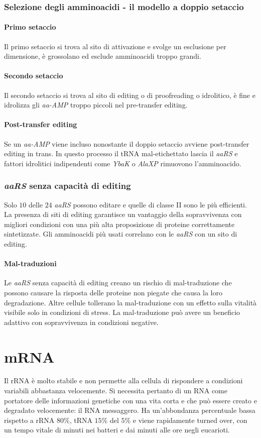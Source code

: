\subsubsection{Selezione degli amminoacidi - il modello a doppio setaccio}
\paragraph{Primo setaccio}
Il primo setaccio si trova al sito di attivazione e svolge un esclusione per dimensione, \`e grossolano ed esclude amminoacidi troppo grandi. 
\paragraph{Secondo setaccio}
Il secondo setaccio si trova al sito di editing o di proofreading o idrolitico, \`e fine e idrolizza gli \emph{aa-AMP} troppo piccoli nel pre-transfer editing. 
\paragraph{Post-transfer editing}
Se un \emph{aa-AMP} viene incluso nonostante il doppio setaccio avviene post-transfer editing in trans. In questo processo il tRNA mal-etichettato lascia il \emph{aaRS} e fattori idrolitici indipendenti
come \emph{YbaK} o \emph{AlaXP} rimuovono l'amminoacido. 
\subsubsection{\emph{aaRS} senza capacit\`a di editing}
Solo $10$ delle $24$ \emph{aaRS} possono editare e quelle di classe II sono le pi\`u efficienti. La presenza di siti di editing garantisce un vantaggio della sopravvivenza con migliori condizioni con
una pi\`u alta proposizione di proteine correttamente sintetizzate. Gli amminoacidi pi\`u usati correlano con le \emph{aaRS} con un sito di editing. 
\paragraph{Mal-traduzioni}
Le \emph{aaRS} senza capacit\`a di editing creano un rischio di mal-traduzione che possono causare la risposta delle proteine non piegate che causa la loro degradazione. Altre cellule tollerano 
la mal-traduzione con un effetto sulla vitalit\`a visibile solo in condizioni di stress. La mal-traduzione pu\`o avere un beneficio adattivo con sopravvivenza in condizioni negative.
\section{mRNA}
Il rRNA \`e molto stabile e non permette alla cellula di rispondere a condizioni variabili abbastanza velocemente. Si necessita pertanto di un RNA come portatore delle informazioni genetiche con una
vita corta e che pu\`o essere creato e degradato velocemente: il RNA messaggero. Ha un'abbondanza percentuale bassa rispetto a rRNA $80\%$, tRNA $15\%$ del $5\%$ e viene rapidamente turned over, con
un tempo vitale di minuti nei batteri e dai minuti alle ore negli eucarioti.
